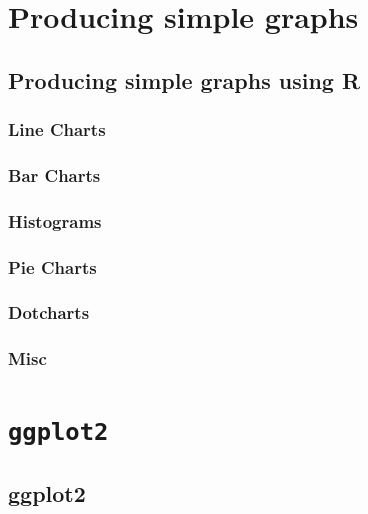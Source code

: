 \documentclass[]{book}
\begin{document}
\hypertarget{producing-simple-graphs}{%
\chapter{Producing simple graphs}\label{producing-simple-graphs}}

\hypertarget{producing-simple-graphs-using-r}{%
\section{Producing simple graphs using R}\label{producing-simple-graphs-using-r}}

\hypertarget{line-charts-1}{%
\subsection{Line Charts}\label{line-charts-1}}

\hypertarget{bar-charts}{%
\subsection{Bar Charts}\label{bar-charts}}

\hypertarget{histograms}{%
\subsection{Histograms}\label{histograms}}

\hypertarget{pie-charts}{%
\subsection{Pie Charts}\label{pie-charts}}

\hypertarget{dotcharts}{%
\subsection{Dotcharts}\label{dotcharts}}

\hypertarget{misc}{%
\subsection{Misc}\label{misc}}

\hypertarget{ggplot2}{%
\chapter{\texorpdfstring{\texttt{ggplot2}}{ggplot2}}\label{ggplot2}}

\hypertarget{ggplot2-1}{%
\section{ggplot2}\label{ggplot2-1}}
\end{document}
